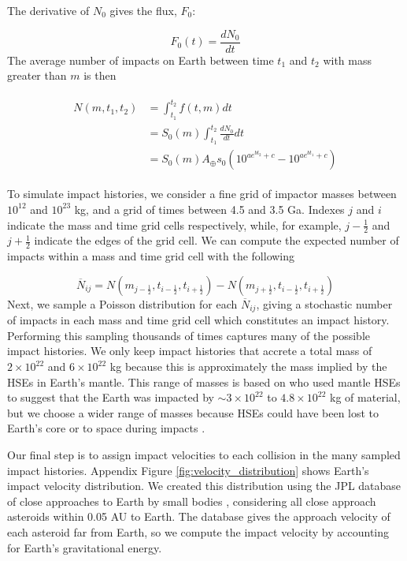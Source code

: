 \documentclass[preprint]{aastex63}
\begin{document}
The derivative of $N_0$ gives the flux, $F_0$:

\begin{equation}
  F_0(t) = \frac{d N_0}{dt}
\end{equation}
The average number of impacts on Earth between time $t_1$ and $t_2$ with mass greater than $m$ is then

\begin{align}
\begin{split}
  N(m,t_1,t_2) &= \int_{t_1}^{t_2} f(t,m) dt \\
  &= S_0(m) \int_{t_1}^{t_2} \frac{d N_0}{dt} dt \\
  &= S_0(m) A_\oplus s_0 \left( 10^{a e^{b t_2} + c} - 10^{a e^{b t_1} + c} \right)
\end{split}
\end{align}

To simulate impact histories, we consider a fine grid of impactor masses between $10^{12}$ and $10^{23}$ kg, and a grid of times between 4.5 and 3.5 Ga. Indexes $j$ and $i$ indicate the mass and time grid cells respectively, while, for example, $j-\frac{1}{2}$ and $j+\frac{1}{2}$ indicate the edges of the grid cell. We can compute the expected number of impacts within a mass and time grid cell with the following

\begin{equation}
  \overline{N}_{ij} = N(m_{j-\frac{1}{2}},t_{i-\frac{1}{2}},t_{i+\frac{1}{2}}) - N(m_{j+\frac{1}{2}},t_{i-\frac{1}{2}},t_{i+\frac{1}{2}})
\end{equation}
Next, we sample a Poisson distribution for each $\overline{N}_{ij}$, giving a stochastic number of impacts in each mass and time grid cell which constitutes an impact history. Performing this sampling thousands of times captures many of the possible impact histories. We only keep impact histories that accrete a total mass of $2 \times 10^{22}$ and $6 \times 10^{22}$ kg because this is approximately the mass implied by the HSEs in Earth's mantle. This range of masses is based on \citet{Day_2015} who used mantle HSEs to suggest that the Earth was impacted by $\sim 3 \times 10^{22}$ to $4.8 \times 10^{22}$ kg of material, but we choose a wider range of masses because HSEs could have been lost to Earth's core or to space during impacts \citep{Marchi_2018}.

Our final step is to assign impact velocities to each collision in the many sampled impact histories. Appendix Figure \ref{fig:velocity_distribution} shows Earth's impact velocity distribution. We created this distribution using the JPL database of close approaches to Earth by small bodies \citep{Park_2023}, considering all close approach asteroids within 0.05 AU to Earth. The database gives the approach velocity of each asteroid far from Earth, so we compute the impact velocity by accounting for Earth's gravitational energy.
\end{document}
